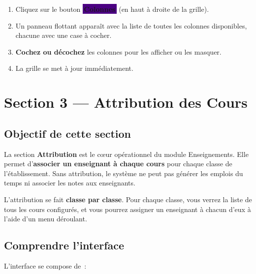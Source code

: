 \documentclass[12pt,a4paper]{report}
\newcommand{\onglet}[1]{{\colorbox{indigo}{\small\sffamily\bfseries\color{white}\,#1\,}}}
\begin{document}
\begin{etape}[title=Proc\'edure : S\'electeur de colonnes]
\begin{enumerate}[leftmargin=1.5cm,label=\textbf{\arabic*.},itemsep=8pt]
  \item Cliquez sur le bouton \onglet{Colonnes} (en haut \`a droite de la grille).
  \item Un panneau flottant appara\^it avec la liste de toutes les colonnes disponibles, chacune avec une case \`a cocher.
  \item \textbf{Cochez ou d\'ecochez} les colonnes pour les afficher ou les masquer.
  \item La grille se met \`a jour imm\'ediatement.
\end{enumerate}
\end{etape}

\newpage
\chapter{Section 3 --- Attribution des Cours}

\section{Objectif de cette section}

La section \textbf{Attribution} est le c\oe ur op\'erationnel du module Enseignements. Elle permet d'\textbf{associer un enseignant \`a chaque cours} pour chaque classe de l'\'etablissement. Sans attribution, le syst\`eme ne peut pas g\'en\'erer les emplois du temps ni associer les notes aux enseignants.

\begin{info}
L'attribution se fait \textbf{classe par classe}. Pour chaque classe, vous verrez la liste de tous les cours configur\'es, et vous pourrez assigner un enseignant \`a chacun d'eux \`a l'aide d'un menu d\'eroulant.
\end{info}

\section{Comprendre l'interface}

L'interface se compose de~:
\end{document}

